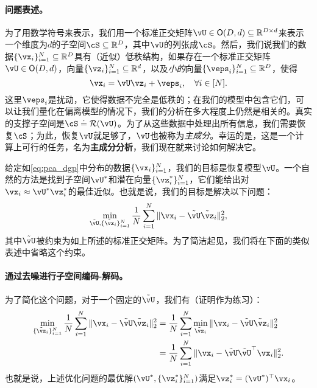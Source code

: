 \documentclass[../../book-main.tex]{subfiles}
\begin{document}
\paragraph{问题表述。}
为了用数学符号来表示，我们用一个标准正交矩阵\(\vU \in \O(D, d) \subseteq \R^{D \times d}\)来表示一个维度为\(d\)的子空间\(\cS \subseteq \R^{D}\)，其中\(\vU\)的列张成\(\cS\)。然后，我们说我们的数据\(\{\vx_{i}\}_{i = 1}^{N} \subseteq \R^{D}\)具有（近似）低秩结构，如果存在一个标准正交矩阵\(\vU \in \O(D, d)\)，向量\(\{\vz_{i}\}_{i = 1}^{N} \subseteq \R^{d}\)，以及\textit{小的}向量\(\{\veps_{i}\}_{i = 1}^{N} \subseteq \R^{D}\)，使得
\begin{equation}\label{eq:pca_dgp}
    \vx_{i} = \vU\vz_{i} + \veps_{i}, \quad \forall i \in [N].
\end{equation}
这里\(\veps_{i}\)是扰动，它使得数据不完全是低秩的；在我们的模型中包含它们，可以让我们量化在偏离模型的情况下，我们的分析在多大程度上仍然是相关的。真实的支撑子空间是\(\cS \doteq \Range(\vU)\)。为了从这些数据中处理出所有信息，我们需要恢复\(\cS\)；为此，恢复\(\vU\)就足够了，\(\vU\)也被称为\textit{主成分}。幸运的是，这是一个计算上可行的任务，名为{\bf 主成分分析}，我们现在就来讨论如何解决它。

给定如\eqref{eq:pca_dgp}中分布的数据\(\{\vx_{i}\}_{i = 1}^{N}\)，我们的目标是恢复模型\(\vU\)。一个自然的方法是找到子空间\(\vU^{\ast}\)和潜在向量\(\{\vz_{i}^{\ast}\}_{i = 1}^{N}\)，它们能给出对\(\vx_{i} \approx \vU^{\ast}\vz_{i}^{\ast}\)的最佳近似。也就是说，我们的目标是解决以下问题：
\begin{equation}\label{eq:pca_sparse_recovery_problem}
    \min_{\tilde{\vU}, \{\tilde{\vz}_{i}\}_{i = 1}^{N}}\frac{1}{N}\sum_{i = 1}^{N}\norm{\vx_{i} - \tilde{\vU}\tilde{\vz}_{i}}_{2}^{2},
\end{equation}
其中\(\tilde{\vU}\)被约束为如上所述的标准正交矩阵。为了简洁起见，我们将在下面的类似表述中省略这个约束。

\paragraph{通过去噪进行子空间编码-解码。}
为了简化这个问题，对于一个固定的\(\tilde{\vU}\)，我们有（证明作为练习）：
\begin{align}
    \min_{\{\tilde{\vz}_{i}\}_{i = 1}^{N}}\frac{1}{N}\sum_{i = 1}^{N}\norm{\vx_{i} - \tilde{\vU}\tilde{\vz}_{i}}_{2}^{2} 
    &= \frac{1}{N}\sum_{i = 1}^{N}\min_{\tilde{\vz}_{i}}\norm{\vx_{i} - \tilde{\vU}\tilde{\vz}_{i}}_{2}^{2} \\
    &= \frac{1}{N}\sum_{i = 1}^{N}\norm{\vx_{i} - \tilde{\vU}\tilde{\vU}^{\top}\vx_{i}}_{2}^{2}. 
\end{align}
也就是说，上述优化问题的最优解\((\vU^{\ast}, \{\vz_{i}^{\ast}\}_{i = 1}^{N})\)满足$\vz_i^{\ast} = (\vU^{\ast})^\top\vx_i$。
\end{document}
